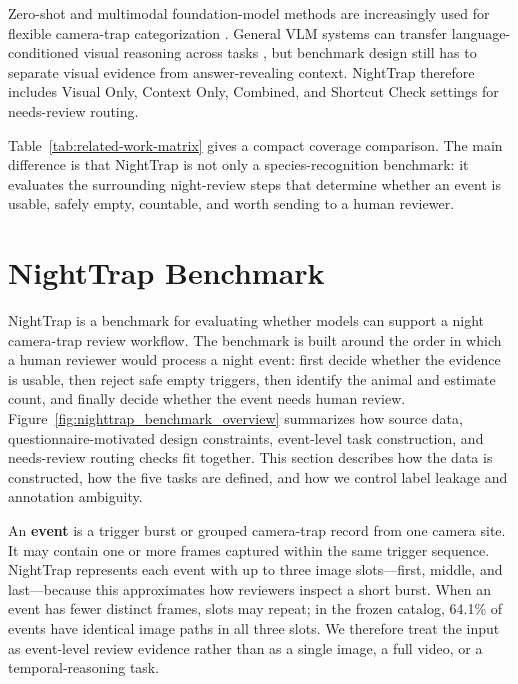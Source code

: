 \documentclass{article}
\begin{document}
Zero-shot and multimodal foundation-model methods are increasingly used for flexible camera-trap categorization \citep{fabian2023wildmatch,vyskocil2024zeroshot}. General VLM systems can transfer language-conditioned visual reasoning across tasks \citep{radford2021clip,alayrac2022flamingo,li2023blip2}, but benchmark design still has to separate visual evidence from answer-revealing context. NightTrap therefore includes Visual Only, Context Only, Combined, and Shortcut Check settings for needs-review routing.

Table~\ref{tab:related-work-matrix} gives a compact coverage comparison. The main difference is that NightTrap is not only a species-recognition benchmark: it evaluates the surrounding night-review steps that determine whether an event is usable, safely empty, countable, and worth sending to a human reviewer.
\section{NightTrap Benchmark}

NightTrap is a benchmark for evaluating whether models can support a night camera-trap review workflow. The benchmark is built around the order in which a human reviewer would process a night event: first decide whether the evidence is usable, then reject safe empty triggers, then identify the animal and estimate count, and finally decide whether the event needs human review. Figure~\ref{fig:nighttrap_benchmark_overview} summarizes how source data, questionnaire-motivated design constraints, event-level task construction, and needs-review routing checks fit together. This section describes how the data is constructed, how the five tasks are defined, and how we control label leakage and annotation ambiguity.

An \textbf{event} is a trigger burst or grouped camera-trap record from one camera site. It may contain one or more frames captured within the same trigger sequence. NightTrap represents each event with up to three image slots---first, middle, and last---because this approximates how reviewers inspect a short burst. When an event has fewer distinct frames, slots may repeat; in the frozen catalog, 64.1\% of events have identical image paths in all three slots. We therefore treat the input as event-level review evidence rather than as a single image, a full video, or a temporal-reasoning task.
\end{document}
